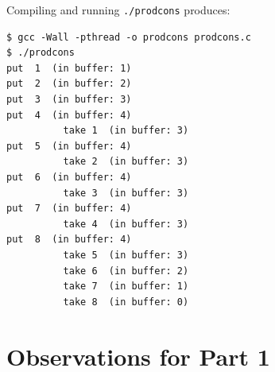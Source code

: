 \documentclass{../latex/utmreport}
\begin{document}
Compiling and running \texttt{./prodcons} produces:

\begin{lstlisting}
$ gcc -Wall -pthread -o prodcons prodcons.c
$ ./prodcons
put  1  (in buffer: 1)
put  2  (in buffer: 2)
put  3  (in buffer: 3)
put  4  (in buffer: 4)
          take 1  (in buffer: 3)
put  5  (in buffer: 4)
          take 2  (in buffer: 3)
put  6  (in buffer: 4)
          take 3  (in buffer: 3)
put  7  (in buffer: 4)
          take 4  (in buffer: 3)
put  8  (in buffer: 4)
          take 5  (in buffer: 3)
          take 6  (in buffer: 2)
          take 7  (in buffer: 1)
          take 8  (in buffer: 0)
\end{lstlisting}

\section{Observations for Part 1}
\end{document}
